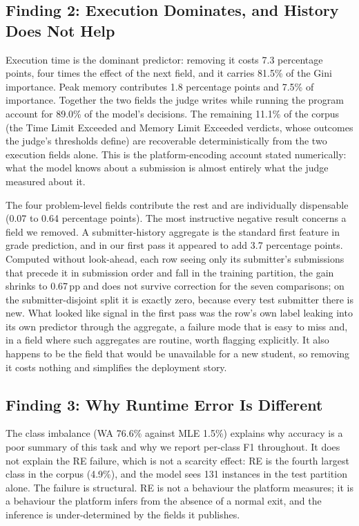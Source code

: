 \documentclass[acmsmall]{acmart}
\begin{document}
\subsection{Finding 2: Execution Dominates, and History Does Not Help}

Execution time is the dominant predictor: removing it costs 7.3 percentage
points, four times the effect of the next field, and it carries 81.5\% of the
Gini importance. Peak memory contributes 1.8 percentage points and 7.5\% of
importance. Together the two fields the judge writes while running the program
account for 89.0\% of the model's decisions. The remaining 11.1\% of the corpus (the Time Limit Exceeded and Memory Limit Exceeded verdicts, whose outcomes the judge's thresholds define) are recoverable deterministically from the two execution fields alone. This is the platform-encoding account stated numerically:
what the model knows about a submission is almost entirely what the judge
measured about it.

The four problem-level fields contribute the rest and are individually
dispensable (0.07 to 0.64 percentage points). The most instructive negative
result concerns a field we removed. A submitter-history aggregate is the
standard first feature in grade prediction, and in our first pass it appeared
to add 3.7 percentage points. Computed without look-ahead, each row seeing
only its submitter's submissions that precede it in submission order and fall
in the training partition, the gain shrinks to 0.67\,pp and does not survive
correction for the seven comparisons; on the submitter-disjoint split it is
exactly zero, because every test submitter there is new. What looked like
signal in the first pass was the row's own label leaking into its own
predictor through the aggregate, a failure mode that is easy to miss and, in a
field where such aggregates are routine, worth flagging explicitly. It also
happens to be the field that would be unavailable for a new student, so
removing it costs nothing and simplifies the deployment story.

\subsection{Finding 3: Why Runtime Error Is Different}

The class imbalance (WA 76.6\% against MLE 1.5\%) explains why accuracy is a
poor summary of this task and why we report per-class F1 throughout. It does not
explain the RE failure, which is not a scarcity effect: RE is the fourth largest
class in the corpus (4.9\%), and the model sees 131 instances in the test
partition alone. The failure is structural. RE is not a behaviour the platform
measures; it is a behaviour the platform infers from the absence of a normal
exit, and the inference is under-determined by the fields it publishes.
\end{document}
